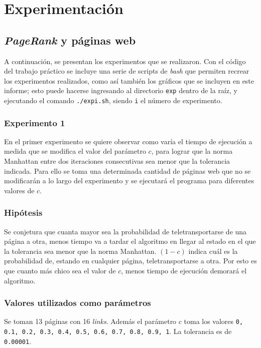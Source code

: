 \section{Experimentación}

	\subsection{\emph{PageRank} y páginas web}

	A continuación, se presentan los experimentos que se realizaron. Con el código del trabajo práctico se incluye una serie de scripts de \emph{bash} que permiten recrear los experimentos realizados, como así también los gráficos que se incluyen en este informe; esto puede hacerse ingresando al directorio \texttt{exp} dentro de la raíz, y ejecutando el comando \texttt{./exp{i}.sh}, siendo \texttt{i} el número de experimento.

		\subsubsection{Experimento 1}
		En el primer experimento se quiere observar como varía el tiempo de ejecución a medida que se modifica el valor del parámetro $c$, para lograr que la norma Manhattan entre dos iteraciones consecutivas sea menor que la tolerancia indicada. Para ello se toma una determinada cantidad de páginas web que no se modificarán a lo largo del experimento y se ejecutará el programa para diferentes valores de $c$. 

			\subsubsection*{Hipótesis}
			Se conjetura que cuanta mayor sea la probabilidad de teletransportarse de una página a otra, menos tiempo va a tardar el algoritmo en llegar al estado en el que la tolerancia sea menor que la norma Manhattan. $(1-c)$ indica cuál es la probabilidad de, estando en cualquier página, teletransportarse a otra. Por esto es que cuanto más chico sea el valor de $c$, menos tiempo de ejecución demorará el algoritmo.

			\subsubsection*{Valores utilizados como parámetros} 
			Se toman 13 páginas con 16 \emph{links}. Además el parámetro $c$ toma los valores \texttt{0, 0.1, 0.2, 0.3, 0.4, 0.5, 0.6, 0.7, 0.8, 0.9, 1}. La tolerancia es de \texttt{0.00001}.

